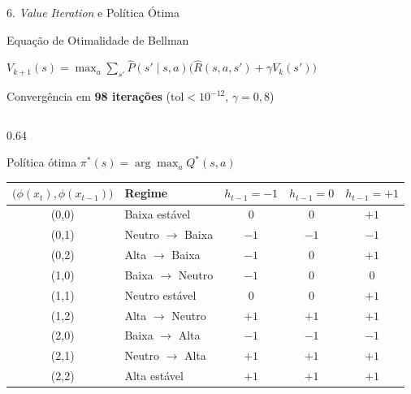 \documentclass[aspectratio=169,10pt,t]{beamer}
\newenvironment{altura}[2][c]{\begin{minipage}[t][#2][#1]{\linewidth}}{\end{minipage}}
\begin{document}
\begin{frame}{6. \textit{Value Iteration} e Política Ótima}

  \begin{block}{Equação de Otimalidade de Bellman}
    {\centering $\displaystyle V_{k+1}(s) = \max_{a} \sum_{s'} \widehat{P}(s' \mid s, a) \Big( \widehat{R}(s, a, s') + \gamma V_k(s') \Big)$\par}
    {\centering\scriptsize Convergência em \textbf{98 iterações} ($\text{tol} < 10^{-12}$, $\gamma = 0{,}8$)\par}
  \end{block}

  \vskip -0.15cm

  \begin{columns}[T,onlytextwidth]
    \begin{column}{0.64\textwidth}
      \begin{block}{Política ótima $\pi^*(s) = \arg\max_{a} Q^*(s,a)$}
        \begin{altura}{3.7cm}
        \centering\scriptsize
        \setlength{\tabcolsep}{4.5pt}
        \renewcommand{\arraystretch}{0.95}
        \begin{tabular}{c l ccc}
          \toprule
          $\big(\phi(x_t),\phi(x_{t-1})\big)$ & \textbf{Regime} & $h_{t-1}=-1$ & $h_{t-1}=0$ & $h_{t-1}=+1$ \\
          \midrule
          (0,0) & Baixa estável      & $0$  & $0$  & $+1$ \\
          (0,1) & Neutro $\to$ Baixa & $-1$ & $-1$ & $-1$ \\
          (0,2) & Alta $\to$ Baixa   & $-1$ & $0$  & $+1$ \\
          \midrule
          (1,0) & Baixa $\to$ Neutro & $-1$ & $0$  & $0$  \\
          (1,1) & Neutro estável     & $0$  & $0$  & $+1$ \\
          (1,2) & Alta $\to$ Neutro  & $+1$ & $+1$ & $+1$ \\
          \midrule
          (2,0) & Baixa $\to$ Alta   & $-1$ & $-1$ & $-1$ \\
          (2,1) & Neutro $\to$ Alta  & $+1$ & $+1$ & $+1$ \\
          (2,2) & Alta estável       & $+1$ & $+1$ & $+1$ \\
          \bottomrule
        \end{tabular}
        \end{altura}
      \end{block}
    \end{column}


\end{columns}
\end{frame}
\end{document}
